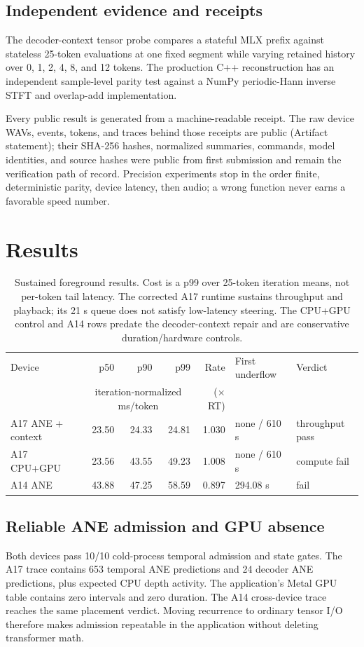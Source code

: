 \documentclass[10pt]{article}
\begin{document}
\subsection{Independent evidence and receipts}
The decoder-context tensor probe compares a stateful MLX prefix against stateless 25-token evaluations at one fixed segment while varying retained history over 0, 1, 2, 4, 8, and 12 tokens. The production C++ reconstruction has an independent sample-level parity test against a NumPy periodic-Hann inverse STFT and overlap-add implementation.

Every public result is generated from a machine-readable receipt. The raw device WAVs, events, tokens, and traces behind those receipts are public (Artifact statement); their SHA-256 hashes, normalized summaries, commands, model identities, and source hashes were public from first submission and remain the verification path of record. Precision experiments stop in the order finite, deterministic parity, device latency, then audio; a wrong function never earns a favorable speed number.

\section{Results}

\begin{table}[H]
\centering
\small
\caption{Sustained foreground results. Cost is a p99 over 25-token iteration
means, not per-token tail latency. The corrected A17 runtime sustains throughput
and playback; its 21 s queue does not satisfy low-latency steering. The CPU+GPU
control and A14 rows predate the decoder-context repair and are conservative
duration/hardware controls.}
\label{tab:sustain}
\begin{tabular}{@{}lrrrrll@{}}
\toprule
Device & p50 & p90 & p99 & Rate & First underflow & Verdict \\
 & \multicolumn{3}{c}{iteration-normalized ms/token} & ($\times$RT) & & \\
\midrule
A17 ANE + context & 23.50 & 24.33 & 24.81 & 1.030 & none / 610 s & throughput pass \\
A17 CPU+GPU & 23.56 & 43.55 & 49.23 & 1.008 & none / 610 s & compute fail \\
A14 ANE & 43.88 & 47.25 & 58.59 & 0.897 & 294.08 s & fail \\
\bottomrule
\end{tabular}
\end{table}

\subsection{Reliable ANE admission and GPU absence}
Both devices pass 10/10 cold-process temporal admission and state gates. The A17 trace contains 653 temporal ANE predictions and 24 decoder ANE predictions, plus expected CPU depth activity. The application's Metal GPU table contains zero intervals and zero duration. The A14 cross-device trace reaches the same placement verdict. Moving recurrence to ordinary tensor I/O therefore makes admission repeatable in the application without deleting transformer math.
\end{document}
